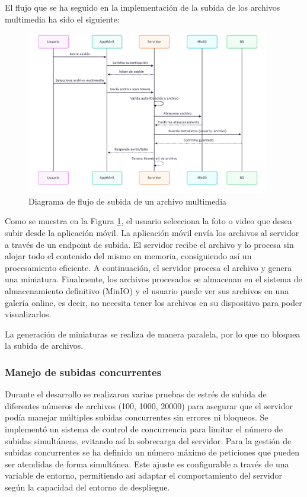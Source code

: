 El flujo que se ha seguido en la implementación de la subida de los archivos multimedia ha sido el siguiente:
\begin{figure}[H]
    \begin{center}
        \includegraphics[width=0.95\textwidth]{assets/sprint3/diagrama-subida-archivos.png}
    \end{center}
    \caption{Diagrama de flujo de subida de un archivo multimedia}\label{fig:diagrama-flujo-subida-archivos}
\end{figure}

Como se muestra en la Figura \ref{fig:diagrama-flujo-subida-archivos}, el usuario selecciona la foto o video que desea subir desde la aplicación móvil. La aplicación móvil envía los archivos al servidor a través de un endpoint de subida. El servidor recibe el archivo y lo procesa sin alojar todo el contenido del mismo en memoria, consiguiendo así un procesamiento eficiente. A continuación, el servidor procesa el archivo y genera una miniatura. Finalmente, los archivos procesados se almacenan en el sistema de almacenamiento definitivo (MinIO) y el usuario puede ver sus archivos en una galería online, es decir, no necesita tener los archivos en su dispositivo para poder visualizarlos.

La generación de miniaturas se realiza de manera paralela, por lo que no bloquea la subida de archivos.

\subsubsection{Manejo de subidas concurrentes}

Durante el desarrollo se realizaron varias pruebas de estrés de subida de diferentes números de archivos (100, 1000, 20000) para asegurar que el servidor podía manejar múltiples subidas concurrentes sin errores ni bloqueos. Se implementó un sistema de control de concurrencia para limitar el número de subidas simultáneas, evitando así la sobrecarga del servidor.
Para la gestión de subidas concurrentes se ha definido un número máximo de peticiones que pueden ser atendidas de forma simultánea. Este ajuste es configurable a través de una variable de entorno, permitiendo así adaptar el comportamiento del servidor según la capacidad del entorno de despliegue.

